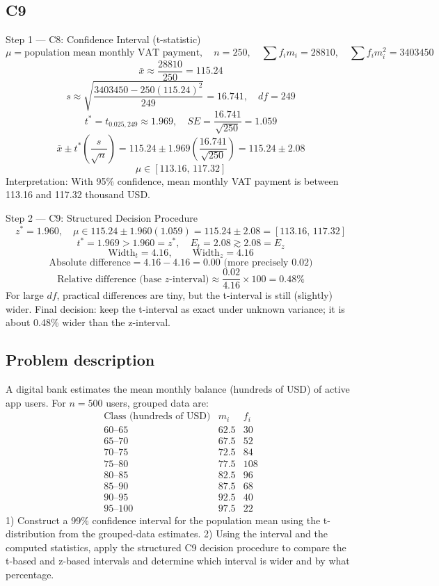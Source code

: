 \begin{ExamProblems}
		\subsection*{C9}
		Step 1 --- C8: Confidence Interval (t-statistic)
		\[
		\mu=\text{population mean monthly VAT payment},\quad n=250,\quad \sum f_im_i=28810,\quad \sum f_im_i^2=3403450
		\]
		\[
		\bar{x}\approx\frac{28810}{250}=115.24
		\]
		\[
		s\approx\sqrt{\frac{3403450-250(115.24)^2}{249}}=16.741,\quad df=249
		\]
		\[
		t^*=t_{0.025,249}\approx 1.969,\quad SE=\frac{16.741}{\sqrt{250}}=1.059
		\]
		\[
		\bar{x}\pm t^*\left(\frac{s}{\sqrt{n}}\right)=115.24\pm 1.969\left(\frac{16.741}{\sqrt{250}}\right)=115.24\pm 2.08
		\]
		\[
		\mu\in[113.16,\,117.32]
		\]
		Interpretation: With 95\% confidence, mean monthly VAT payment is between 113.16 and 117.32 thousand USD.

		Step 2 --- C9: Structured Decision Procedure
		\[
		z^*=1.960,\quad \mu\in 115.24\pm 1.960(1.059)=115.24\pm 2.08=[113.16,\,117.32]
		\]
		\[
		t^*=1.969>1.960=z^*,\quad E_t=2.08\gtrsim 2.08=E_z
		\]
		\[
		\text{Width}_t=4.16,\qquad \text{Width}_z=4.16
		\]
		\[
		\text{Absolute difference}=4.16-4.16=0.00\text{ (more precisely }0.02\text{)}
		\]
		\[
		\text{Relative difference (base }z\text{-interval)}\approx\frac{0.02}{4.16}\times 100=0.48\%
		\]
		For large $df$, practical differences are tiny, but the t-interval is still (slightly) wider.
		Final decision: keep the t-interval as exact under unknown variance; it is about 0.48\% wider than the z-interval.

		\newpage
		\item
		\subsection*{Problem description}
		A digital bank estimates the mean monthly balance (hundreds of USD) of active app users.
		For $n=500$ users, grouped data are:
		\[
		\begin{array}{c|c|c}
		\text{Class (hundreds of USD)} & m_i & f_i\\\hline
		60\text{--}65 & 62.5 & 30\\
		65\text{--}70 & 67.5 & 52\\
		70\text{--}75 & 72.5 & 84\\
		75\text{--}80 & 77.5 & 108\\
		80\text{--}85 & 82.5 & 96\\
		85\text{--}90 & 87.5 & 68\\
		90\text{--}95 & 92.5 & 40\\
		95\text{--}100 & 97.5 & 22
		\end{array}
		\]
		1) Construct a 99\% confidence interval for the population mean using the t-distribution from the grouped-data estimates.
		2) Using the interval and the computed statistics, apply the structured C9 decision procedure to compare the t-based and z-based intervals and determine which interval is wider and by what percentage.


\end{ExamProblems}
